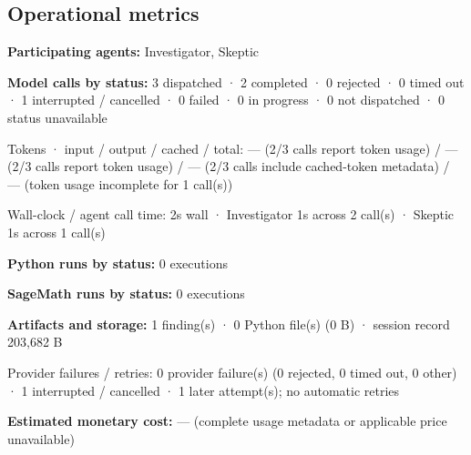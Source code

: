 \documentclass[11pt]{article}
\begin{document}
\subsection{Operational metrics}
\textbf{Participating agents:} Investigator, Skeptic\par
\textbf{Model calls by status:} 3 dispatched · 2 completed · 0 rejected · 0 timed out · 1 interrupted / cancelled · 0 failed · 0 in progress · 0 not dispatched · 0 status unavailable\par
Tokens · input / output / cached / total: — (2/3 calls report token usage) / — (2/3 calls report token usage) / — (2/3 calls include cached-token metadata) / — (token usage incomplete for 1 call(s))\par
Wall-clock / agent call time: 2s wall · Investigator 1s across 2 call(s) · Skeptic 1s across 1 call(s)\par
\textbf{Python runs by status:} 0 executions\par
\textbf{SageMath runs by status:} 0 executions\par
\textbf{Artifacts and storage:} 1 finding(s) · 0 Python file(s) (0 B) · session record 203,682 B\par
Provider failures / retries: 0 provider failure(s) (0 rejected, 0 timed out, 0 other) · 1 interrupted / cancelled · 1 later attempt(s); no automatic retries\par
\textbf{Estimated monetary cost:} — (complete usage metadata or applicable price unavailable)\par
\end{document}
